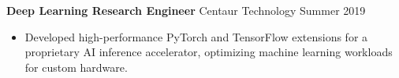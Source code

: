 \textbf{Deep Learning Research Engineer}
 Centaur Technology \hfill Summer 2019

\begin{itemize} \itemsep -2pt

\item Developed high-performance PyTorch and TensorFlow extensions for a proprietary AI inference accelerator, optimizing machine learning workloads for custom hardware.            


\end{itemize}
